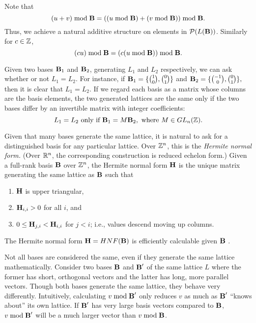 Note that
\[(u + v) \bmod \text{\textbf B} = ((u \bmod \text{\textbf B}) + (v \bmod \textbf B)) \bmod \text{\textbf B}.\] Thus, we achieve a natural additive structure on elements in $\mathcal{P}(L(\textbf B))$.  Similarly for $c \in \mathbb{Z}$, \[(cu) \bmod \text{\textbf B} = (c (u \bmod \textbf B)) \bmod \textbf B.\]

Given two bases ${\textbf B}_1$ and ${\textbf B}_2$, generating $L_1$ and $L_2$ respectively, we can ask whether or not $L_1 = L_2$. For instance, if ${\textbf B}_1 = \{\binom{1}{0}, \binom{0}{1}\}$ and ${\textbf B}_2 = \{\binom{-1}{0}, \binom{0}{1}\},$ then it is clear that $L_1 = L_2$. If we regard each basis as a matrix whose columns are the basis elements, the two generated lattices are the same only if the two bases differ by an invertible matrix with integer coefficients:
\[L_1 = L_2 \text{ only if } {\textbf B}_1 = M {\textbf B}_2, \text{ where } M \in GL_n(\mathbb{Z}).\]

Given that many bases generate the same lattice, it is natural to ask for a distinguished basis for any particular lattice. Over $\mathbb{Z}^n$, this is the \emph{Hermite normal form.} (Over $\mathbb{R}^n$, the corresponding construction is reduced echelon form.) Given a full-rank basis $\textbf{B}$ over $\mathbb{Z}^n$, the Hermite normal form $\textbf{H}$ is the unique matrix generating the same lattice as $\textbf{B}$ such that
\begin{enumerate}
\item $\textbf{H}$ is upper triangular,
\item $\textbf{H}_{i,i} > 0$ for all $i$, and
\item $0 \leq \textbf{H}_{j, i} < \textbf{H}_{i,i}$ for $j < i$; i.e., values descend moving up columns.
\end{enumerate}

The Hermite normal form $\textbf{H} = HNF(\textbf{B})$ is efficiently calculable given $\textbf{B}$ \cite{micciancio2001linear}.

Not all bases are considered the same, even if they generate the same lattice mathematically. Consider two bases $\textbf{B}$ and $\textbf{B}'$ of the same lattice $L$ where the former has short, orthogonal vectors and the latter has long, more parallel vectors. Though both bases generate the same lattice, they behave very differently. Intuitively, calculating $v \bmod \textbf{B}'$ only reduces $v$ as much as $\textbf{B}'$ ``knows about'' its own lattice. If $\textbf{B}'$ has very large basis vectors compared to $\textbf{B}$, $v \bmod \textbf{B}'$ will be a much larger vector than $v \bmod \textbf{B}$.

